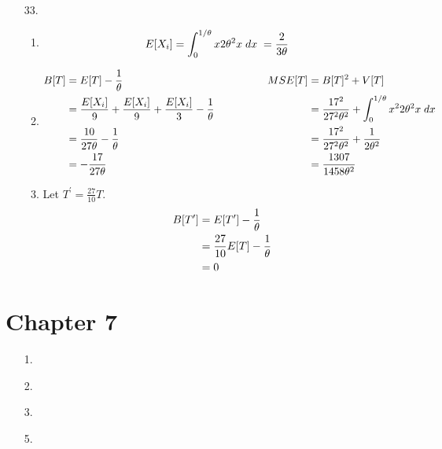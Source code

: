 \documentclass{article}
\def\prm{^\prime}
\def\dx{\; dx \;}
\begin{document}
\begin{enumerate}
\newpage
\item[33.]
\begin{enumerate}
\item
\begin{align}
	E[X_i] &= \int_0^{1/\theta} x 2 \theta^2 x \dx = \dfrac{2}{3 \theta} \notag
\end{align}

\item
\begin{align}
	B[T] &= E[T] - \dfrac{1}{\theta}
	&\hspace{4em} MSE[T] &= B[T]^2 + V[T]
	\notag\\
	&= \dfrac{E[X_i]}{9} + \dfrac{E[X_i]}{9} + \dfrac{E[X_i]}{3} - \dfrac{1}{\theta}
	&&= \dfrac{17^2}{27^2 \theta^2} + \int_0^{1/\theta} x^2 2 \theta^2 x \dx
	\notag\\
	&= \dfrac{10}{27 \theta} - \dfrac{1}{\theta}
	&&= \dfrac{17^2}{27^2 \theta^2} + \dfrac{1}{2 \theta^2}
	\notag\\
	&= -\dfrac{17}{27 \theta}
	&&= \dfrac{1307}{1458 \theta^2}
	\notag
\end{align}

\item
Let $T\prm = \frac{27}{10} T$.
\begin{align}
	B[T\prm] &= E[T\prm] - \dfrac{1}{\theta}
	\notag\\
	&= \dfrac{27}{10} E[T] - \dfrac{1}{\theta}
	\notag\\
	&= 0
	\notag
\end{align}
\end{enumerate}


\end{enumerate}
\section*{Chapter 7}
\begin{enumerate}


\item[1.]


\item[2.]


\item[3.]


\item[5.]


\end{enumerate}
\end{document}
